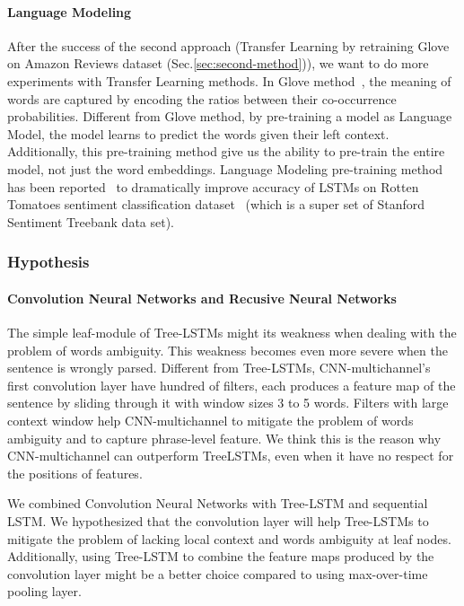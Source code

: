 \paragraph{Language Modeling}
After the success of the second approach (Transfer Learning by retraining Glove on Amazon Reviews dataset (Sec.\ref{sec:second-method})), we want to do more experiments with Transfer Learning methods.
In Glove method~\cite{glove}, the meaning of words are captured by encoding the ratios between their co-occurrence probabilities.
Different from Glove method, by pre-training a model as Language Model, the model learns to predict the words given their left context.
Additionally, this pre-training method give us the ability to pre-train the entire model, not just the word embeddings. 
Language Modeling pre-training method has been reported~\cite{semisup-seq2seq} to dramatically improve accuracy of LSTMs on Rotten Tomatoes sentiment classification dataset~\cite{Rotten-Tomato} (which is a super set of Stanford Sentiment Treebank data set).

\subsubsection{Hypothesis}
\paragraph{Convolution Neural Networks and Recusive Neural Networks}
The simple leaf-module of Tree-LSTMs might its weakness when dealing with the problem of words ambiguity.
This weakness becomes even more severe when the sentence is wrongly parsed.
Different from Tree-LSTMs, CNN-multichannel's~\cite{KimCNN} first convolution layer have hundred of filters, each produces a feature map of the sentence by sliding through it with window sizes 3 to 5 words.
Filters with large context window help CNN-multichannel to mitigate the problem of words ambiguity and to capture phrase-level feature.
We think this is the reason why CNN-multichannel  can outperform TreeLSTMs, even when it have no respect for the positions of features. 

We combined Convolution Neural Networks with Tree-LSTM and sequential LSTM.
We hypothesized that the convolution layer will help Tree-LSTMs to mitigate the problem of lacking local context and words ambiguity at leaf nodes.
Additionally, using Tree-LSTM to combine the feature maps produced by the convolution layer might be a better choice compared to using max-over-time pooling layer.
